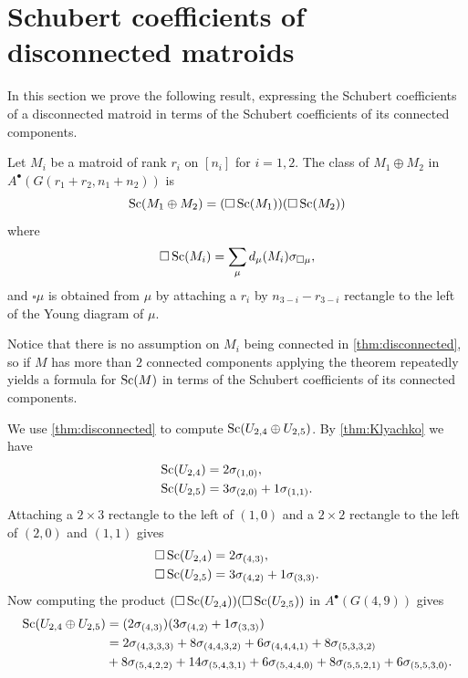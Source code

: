 \section{Schubert coefficients of disconnected matroids}

In this section we prove the following result, expressing the Schubert coefficients of a disconnected matroid in terms of the Schubert coefficients of its connected components.
\begin{thm}
    \label{thm:disconnected}
    Let $M_i$ be a matroid of rank $r_i$ on $[n_i]$ for $i = 1, 2$. The class of $M_1\oplus M_2$ in $A^\bullet(G(r_1+r_2,n_1+n_2))$ is
    \begin{equation*}
        \operatorname{\mathrm{Sc}}(M_1\oplus M_2) = (\square \operatorname{\mathrm{Sc}}(M_1))(\square \operatorname{\mathrm{Sc}}(M_2))
    \end{equation*}
    where
    \begin{equation*}
        \square \operatorname{\mathrm{Sc}}(M_i) = \sum_\mu d_\mu(M_i) \sigma_{\square \mu},
    \end{equation*}
    and \(\square \mu\) is obtained from \(\mu\) by attaching a \(r_i\) by \(n_{3-i} - r_{3-i}\) rectangle to the left of the Young diagram of \(\mu\).
\end{thm}
Notice that there is no assumption on \(M_i\) being connected in \cref{thm:disconnected}, so if \(M\) has more than \(2\) connected components applying the theorem repeatedly yields a formula for \(\operatorname{\mathrm{Sc}}(M)\) in terms of the Schubert coefficients of its connected components.

\begin{example}
    We use \cref{thm:disconnected} to compute \(\operatorname{\mathrm{Sc}}(U_{2,4} \oplus U_{2,5})\). By \cref{thm:Klyachko} we have
    \begin{align*}
        \operatorname{\mathrm{Sc}}(U_{2,4}) &= 2 \sigma_{(1,0)}, \\
        \operatorname{\mathrm{Sc}}(U_{2,5}) &= 3 \sigma_{(2,0)} + 1 \sigma_{(1,1)}.
    \end{align*}
    Attaching a \(2\times 3\) rectangle to the left of \((1,0)\) and a \(2 \times 2\) rectangle to the left of \((2,0)\) and \((1,1)\) gives
    \begin{align*}
        \square\operatorname{\mathrm{Sc}}(U_{2,4}) &= 2 \sigma_{(4,3)}, \\
        \square \operatorname{\mathrm{Sc}}(U_{2,5}) &= 3 \sigma_{(4,2)} + 1 \sigma_{(3,3)}.
    \end{align*}
    Now computing the product \((\square\operatorname{\mathrm{Sc}}(U_{2,4}))(\square \operatorname{\mathrm{Sc}}(U_{2,5}))\) in \(A^\bullet(G(4,9))\) gives
    \begin{align*}
        \operatorname{\mathrm{Sc}}(U_{2,4} \oplus U_{2,5}) &= (2 \sigma_{(4,3)})(3 \sigma_{(4,2)} + 1 \sigma_{(3,3)})\\
        &= 2\sigma_{(4, 3, 3, 3)} + 8\sigma_{(4, 4, 3, 2)} + 6\sigma_{(4, 4, 4, 1)} + 8\sigma_{(5, 3, 3, 2)} \\
        & + 8\sigma_{(5, 4, 2, 2)} + 14\sigma_{(5, 4, 3, 1)} + 6\sigma_{(5, 4, 4, 0)} + 8\sigma_{(5, 5, 2, 1)} + 6\sigma_{(5, 5, 3, 0)}.
    \end{align*}
\end{example}

